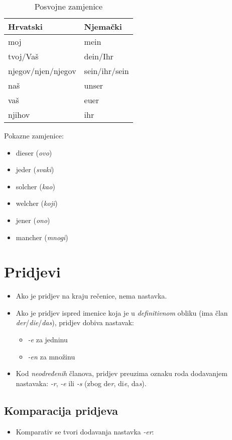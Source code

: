 \documentclass[12pt,german]{article}
\newcommand{\nastavak}[1]{\emph{-#1}}
\newcommand{\clan}[1]{\emph{#1}}
\newcommand{\primjer}[2]{\say{#1 $\longmapsto$ #2}}
\newcommand{\prijevod}[2]{\item #1 (\emph{#2})}
\begin{document}
\begin{multicols}{2}
\begin{table}[H]
\caption{Posvojne zamjenice}
\begin{tabular}{ll}
\toprule
Hrvatski  &  Njemački \\
\midrule
moj & mein \\
tvoj/Vaš & dein/Ihr \\
njegov/njen/njegov & sein/ihr/sein \\
naš & unser \\
vaš & euer \\
njihov & ihr \\
\bottomrule
\end{tabular}
\end{table}

Pokazne zamjenice:
\begin{itemize}[nolistsep, label={}]
    \prijevod{dieser}{ovo}
    \prijevod{jeder}{svaki}
    \prijevod{solcher}{kao}
    \prijevod{welcher}{koji}
    \prijevod{jener}{ono}
    \prijevod{mancher}{mnogi}
\end{itemize}

\section{Pridjevi}
\begin{itemize}
  \item Ako je pridjev na kraju rečenice, nema nastavka.
  \item Ako je pridjev ispred imenice koja je u \emph{definitivnom} obliku (ima član \clan{der}/\clan{die}/\clan{das}), pridjev dobiva nastavak:
  \begin{itemize}[label={}]
    \item \nastavak{e} za jedninu
    \item \nastavak{en} za množinu
  \end{itemize}
  \item Kod \emph{neodređenih} članova, pridjev preuzima oznaku roda dodavanjem nastavaka: \nastavak{r}, \nastavak{e} ili \nastavak{s} (zbog de\emph{r}, di\emph{e}, da\emph{s}). %
\end{itemize}

\subsection{Komparacija pridjeva}
\begin{itemize}
  \item Komparativ se tvori dodavanja nastavka \nastavak{er}: \\
    \primjer{sch\"on}{sch\"oner}


\end{itemize}
\end{multicols}
\end{document}

